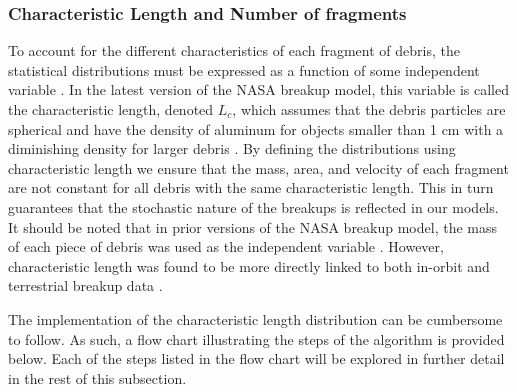 \documentclass[a4paper, 12pt]{article}
\begin{document}
\subsubsection{Characteristic Length and Number of fragments}

To account for the different characteristics of each fragment of debris, the statistical distributions must be expressed as a function of some independent variable \citep{johnson_nasas_2001}. In the latest version of the NASA breakup model, this variable is called the characteristic length, denoted $L_c$, which assumes that the debris particles are spherical and have the density of aluminum for objects smaller than 1 cm with a diminishing density for larger debris \citep{johnson_nasas_2001}. By defining the distributions using characteristic length we ensure that the mass, area, and velocity of each fragment are not constant for all debris with the same characteristic length. This in turn guarantees that the stochastic nature of the breakups is reflected in our models. It should be noted that in prior versions of the NASA breakup model, the mass of each piece of debris was used as the independent variable \citep{krisko_proper_2011}. However, characteristic length was found to be more directly linked to both in-orbit and terrestrial breakup data \citep{johnson_nasas_2001}.

The implementation of the characteristic length distribution can be cumbersome to follow. As such, a flow chart illustrating the steps of the algorithm is provided below. Each of the steps listed in the flow chart will be explored in further detail in the rest of this subsection.
\end{document}
